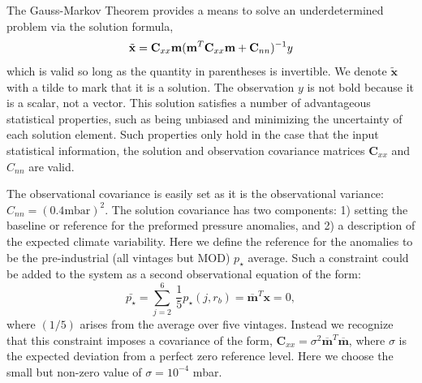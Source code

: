 \documentclass[12pt]{article}
\begin{document}
The Gauss-Markov Theorem provides a means to solve an underdetermined problem via the solution formula, 
\begin{equation}
\label{eq:5}
{\tilde {\bf x}} = {\bf C}_{xx} {\bf m} (\mathbf{m}^{T}{\bf C}_{xx} {\bf m} + {\bf C}_{nn})^{-1} y
\end{equation}
which is valid so long as the quantity in parentheses is invertible. We denote $\mathbf{\tilde{x}}$ with a tilde to mark that it is a solution. The observation $y$
is not bold because it is a scalar, not a vector. This solution satisfies a number of advantageous statistical properties, such as being unbiased and minimizing the uncertainty of each solution element. Such properties only hold in the case that the input statistical information, the solution and observation covariance matrices $\mathbf{C}_{xx}$ and $C_{nn}$ are valid. 

The observational covariance is easily set as it is the observational
variance: $C_{nn} = (0.4 \mathrm{mbar})^{2}$. The solution covariance has two components: 1) setting the baseline or reference for the preformed pressure anomalies, and 2)
a description of the expected climate variability.
Here we define the reference for the anomalies to be the pre-industrial (all vintages but MOD) $p_{\star}$ average. Such a constraint could be added to the system as a second observational equation of the form:
\begin{equation}
\label{eq:7}
\bar{p_{\star}} = \sum_{j=2}^{6} ~\frac{1}{5}  p_{\star}(j, r_{b}) = \mathbf{\overline{m}}^{T} \mathbf{x} = 0,
\end{equation}
where $(1 /5)$ arises from the average over five vintages. Instead we recognize that this constraint imposes a covariance of the form, $\mathbf{C}_{xx} = \sigma^{2 }\mathbf{\overline{m}}^{T} \mathbf{\overline{m}}$, where $\sigma$ is the expected deviation from a perfect zero reference level. Here we choose the small but non-zero value of $\sigma=10^{-4}$ mbar.
\end{document}
